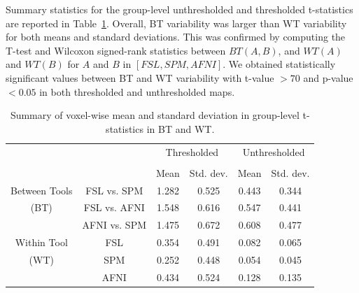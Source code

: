 \documentclass[conference]{IEEEtran}
\begin{document}
Summary statistics for the group-level unthresholded and thresholded t-statistics are reported in Table~\ref{table:pipeline-stats}.
Overall, BT variability was larger than WT variability for both means and standard deviations.
This was confirmed by computing the T-test and Wilcoxon signed-rank statistics between $BT(A, B)$, and $WT(A)$ and $WT(B)$ for $A$ and $B$ in $[FSL, SPM, AFNI]$.
We obtained statistically significant values between BT and WT variability with t-value $> 70$ and p-value $< 0.05$ in both thresholded and unthresholded maps.

\setlength{\tabcolsep}{5pt}
\begin{table}[h]
    \centering
    \begin{tabular}{cccc|cc}
        \toprule
        \multirow{2}{*}{}& {} & \multicolumn{2}{c}{Thresholded} & \multicolumn{2}{c}{Unthresholded} \\
        \cmidrule{3-4} \cmidrule{5-6} \\
        {} & {} & Mean & Std. dev. & Mean & Std. dev. \\
        \midrule
        \rowcolor{lightgray}
        {Between Tools} & FSL vs. SPM        &  1.282       & 0.525      & 0.443     & 0.344  \\
        \rowcolor{lightgray}
        {(BT)} & FSL vs. AFNI                &  1.548       & 0.616      & 0.547     & 0.441  \\
        \rowcolor{lightgray}
        {} & AFNI vs. SPM                    &  1.475       & 0.672      & 0.608     & 0.477  \\
        {Within Tool} & FSL                  &  0.354       & 0.491      & 0.082     & 0.065  \\
        {(WT)}   & SPM                       &  0.252       & 0.448      & 0.054     & 0.045  \\
        {}   & AFNI                          &  0.434       & 0.524      & 0.128     & 0.135  \\
        \bottomrule
    \end{tabular}
    \caption{Summary of voxel-wise mean and standard deviation in group-level t-statistics in BT and WT.}
    \label{table:pipeline-stats}
\end{table}


\end{document}
